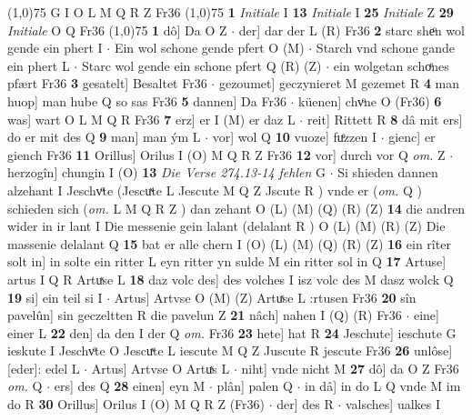 \documentclass[8pt,a4paper,notitlepage]{article}
\begin{document}
\begin{table}[ht]
\begin{minipage}[t]{0.5\linewidth}
\begin{tabular}{rl}
\end{tabular}
\scriptsize
\line(1,0){75} \newline
G I O L M Q R Z Fr36 \newline
\line(1,0){75} \newline
\textbf{1} \textit{Initiale} I  \textbf{13} \textit{Initiale} I  \textbf{25} \textit{Initiale} Z  \textbf{29} \textit{Initiale} O Q Fr36  \newline
\line(1,0){75} \newline
\textbf{1} dô] Da O Z  $\cdot$ der] dar der L (R) Fr36 \textbf{2} starc sheͦn wol gende ein phert I  $\cdot$ Ein wol schone gende pfert O (M)  $\cdot$ Starch vnd schone gande ein phert L  $\cdot$ Starc wol gende ein schone pfert Q (R) (Z)  $\cdot$ ein wolgetan schoͤnes pfært Fr36 \textbf{3} gesatelt] Besaltet Fr36  $\cdot$ gezoumet] geczynieret M gezemet R \textbf{4} man huop] man hube Q so sas Fr36 \textbf{5} dannen] Da Fr36  $\cdot$ küenen] chvͦne O (Fr36) \textbf{6} was] wart O L M Q R Fr36 \textbf{7} erz] er I (M) er daz L  $\cdot$ reit] Rittett R \textbf{8} dâ mit ers] do er mit des Q \textbf{9} man] man ým L  $\cdot$ vor] wol Q \textbf{10} vuoze] fuͤzzen I  $\cdot$ gienc] er giench Fr36 \textbf{11} Orillus] Orilus I (O) M Q R Z Fr36 \textbf{12} vor] durch vor Q \textit{om.} Z  $\cdot$ herzogîn] chungin I (O) \textbf{13} \textit{Die Verse 274.13-14 fehlen} G   $\cdot$ Si shieden dannen alzehant I Jeschvͦte (Jescuͯte L Jescute M Q Z Jscute R ) vnde er (\textit{om.} Q ) schieden sich (\textit{om.} L M Q R Z ) dan zehant O (L) (M) (Q) (R) (Z) \textbf{14} die andren wider in ir lant I Die messenie gein lalant (delalant R ) O (L) (M) (R) (Z) Die massenie delalant Q \textbf{15} bat er alle chern I (O) (L) (M) (Q) (R) (Z) \textbf{16} ein rîter solt in] in solte ein ritter L eyn ritter yn sulde M ein ritter sol in Q \textbf{17} Artuse] artus I Q R Artuͯse L \textbf{18} daz volc des] des volches I isz volc des M dasz wolck Q \textbf{19} si] ein teil si I  $\cdot$ Artus] Artvse O (M) (Z) Artuͯse L :rtusen Fr36 \textbf{20} sîn pavelûn] sin geczeltten R die pavelun Z \textbf{21} nâch] nahen I (Q) (R) Fr36  $\cdot$ eine] einer L \textbf{22} den] da den I der Q \textit{om.} Fr36 \textbf{23} hete] hat R \textbf{24} Jeschute] ieschute G ieskute I Jeschvͦte O Jescuͯte L iescute M Q Z Juscute R jescute Fr36 \textbf{26} unlôse] [eder]: edel L  $\cdot$ Artus] Artvse O Artuͯs L  $\cdot$ niht] vnde nicht M \textbf{27} dô] da O Z Fr36 \textit{om.} Q  $\cdot$ ers] des Q \textbf{28} einen] eyn M  $\cdot$ plân] palen Q  $\cdot$ in dâ] in do L Q vnde M im do R \textbf{30} Orillus] Orilus I (O) M Q R Z (Fr36)  $\cdot$ der] des R  $\cdot$ valsches] ualkes I \newline

\end{minipage}
\end{table}
\end{document}
